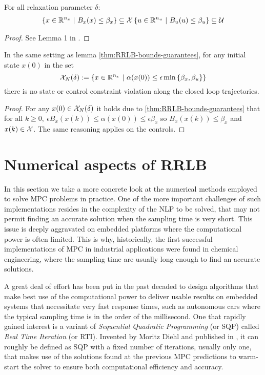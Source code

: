 \documentclass[12pt]{article}
\begin{document}
\begin{lemma}
	\label{thm:constraint-set-def-with-RRLB}
	For all relaxation parameter $\delta$:
	\begin{align*}
		\left\{x\in\R^{n_x}~|~B_x(x)\leq\beta_x\right\}\subseteq\cal{X}
		\left\{u\in\R^{n_u}~|~B_u(u)\leq\beta_u\right\}\subseteq\cal{U}
	\end{align*}
\end{lemma}

\begin{proof}
	See Lemma 1 in \cite{RRLB-linear-MPC}.
\end{proof}

\begin{theorem}
	In the same setting as lemma \ref{thm:RRLB-bounds-guarantees}, for any initial state $x(0)$ in the set
	$$\cal{X}_N(\delta):=\left\{x\in\R^{n_x}~|~\alpha(x(0))\leq\epsilon\min\left\{\beta_x,\beta_u\right\}\right\}$$
	there is no state or control constraint violation along the closed loop trajectories.
\end{theorem}

\begin{proof}
	For any $x(0)\in\cal{X}_N(\delta)$ it holds due to \ref{thm:RRLB-bounds-guarantees} that for all $k\geq 0,~\epsilon B_x(x(k))\leq\alpha(x(0))\leq\epsilon\beta_x$ so $B_x(x(k))\leq \beta_x$ and $x(k)\in\cal{X}$.
	The same reasoning applies on the controls.
\end{proof}


\section{Numerical aspects of RRLB}\label{sec:RRLB-numerical-aspects}

In this section we take a more concrete look at the numerical methods employed to solve MPC problems in practice.
One of the more important challenges of such implementations resides in the complexity of the NLP to be solved, that may not permit finding an accurate solution when the sampling time is very short.
This issue is deeply aggravated on embedded platforms where the computational power is often limited.
This is why, historically, the first successful implementations of MPC in industrial applications were found in chemical engineering, where the sampling time are usually long enough to find an accurate solutions.

A great deal of effort has been put in the past decaded to design algorithms that make best use of the computational power to deliver usable results on embedded systems that necessitate very fast response times, such as autonomous cars where the typical sampling time is in the order of the millisecond.
One that rapidly gained interest is a variant of \textit{Sequential Quadratic Programming} (or SQP) called \textit{Real Time Iteration} (or RTI).
Invented by Moritz Diehl and published in \cite{rti-diehl}, it can roughly be defined as SQP with a fixed number of iterations, usually only one, that makes use of the solutions found at the previous MPC predictions to warm-start the solver to ensure both computational efficiency and accuracy.
\end{document}
